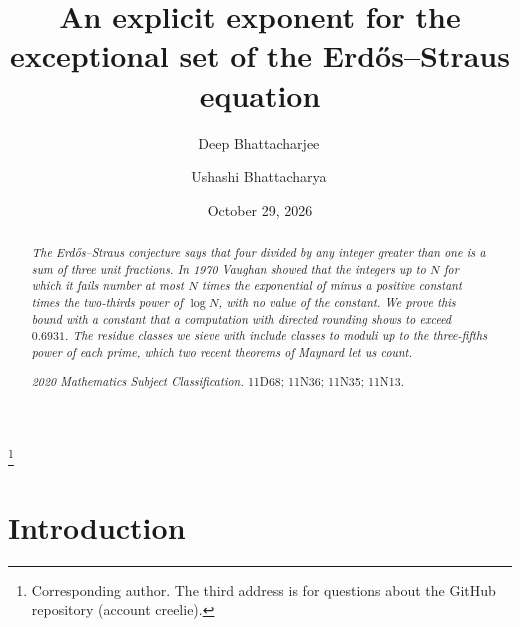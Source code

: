 \documentclass[aps,prd,twocolumn,superscriptaddress,nofootinbib,longbibliography,floatfix,showkeys,nobalancelastpage,amsmath,amssymb,10pt]{revtex4-2}
\theoremstyle{plain}
\theoremstyle{definition}
\theoremstyle{plain}
\newcommand{\cbound}{0.6931}
\begin{document}
\title{An explicit exponent for the exceptional set of the Erd\H{o}s--Straus equation}

\author{Deep Bhattacharjee\,}
\thanks{Corresponding author. The third address is for questions about the GitHub repository (account creelie).}

\author{Ushashi Bhattacharya\,}

\date{October 29, 2026}

\begin{abstract}
\itshape
The Erd\H{o}s--Straus conjecture says that four divided by any integer greater than one is a sum of three unit fractions. In 1970 Vaughan showed that the integers up to $N$ for which it fails number at most $N$ times the exponential of minus a positive constant times the two-thirds power of $\log N$, with no value of the constant. We prove this bound with a constant that a computation with directed rounding shows to exceed $\cbound$. The residue classes we sieve with include classes to moduli up to the three-fifths power of each prime, which two recent theorems of Maynard let us count.
\par\medskip\upshape\noindent\textit{2020 Mathematics Subject Classification.} 11D68; 11N36; 11N35; 11N13.
\end{abstract}


\maketitle
\makeatletter\renewcommand\l@subsection[2]{}\renewcommand\l@subsubsection[2]{}\makeatother
\tableofcontents

\section{Introduction}\label{sec:intro}
\end{document}
